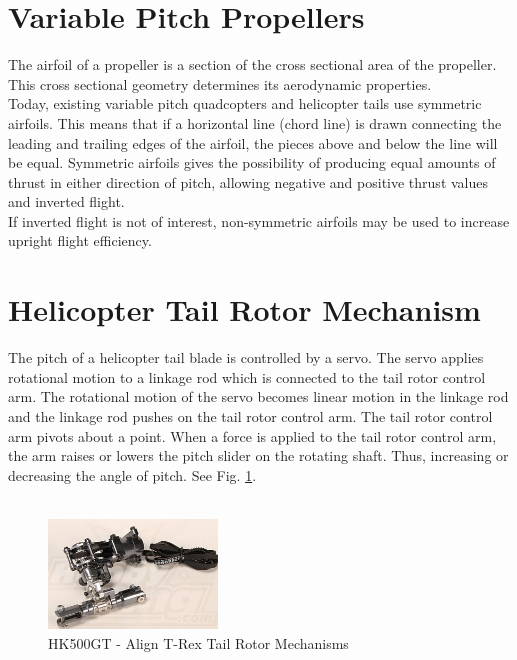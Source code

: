 \section{Variable Pitch Propellers}

The airfoil of a propeller is a section of the cross sectional area of the propeller. This cross sectional geometry determines its aerodynamic properties.\\


Today, existing variable pitch quadcopters and helicopter tails use symmetric airfoils. This means that if a horizontal line (chord line) is drawn connecting the leading and trailing edges of the airfoil, the pieces above and below the line will be equal. 
Symmetric airfoils gives the possibility of producing equal amounts of thrust in either direction of pitch, allowing negative and positive thrust values and inverted flight.  
\\
If inverted flight is not of interest, non-symmetric airfoils may be used to increase upright flight efficiency.


\clearpage

\section{Helicopter Tail Rotor Mechanism}
The pitch of a helicopter tail blade is controlled by a servo. The servo applies rotational motion to a linkage rod which is connected to the tail rotor control arm. The rotational motion of the servo becomes linear motion in the linkage rod and the linkage rod pushes on the tail rotor control arm. The tail rotor control arm pivots about a point. When a force is applied to the tail rotor control arm, the arm raises or lowers the pitch slider on the rotating shaft. Thus, increasing or decreasing the angle of pitch. See Fig. \ref{fig:helitailrotor}.\\ 
\\
\begin{figure}[H]
\centering
    \includegraphics[width = 0.4\textwidth]{VAPIQ-PICTURES/hk500gt}
    \caption{HK500GT - Align T-Rex Tail Rotor Mechanisms}
    \label{fig:helitailrotor}    
\end{figure}

